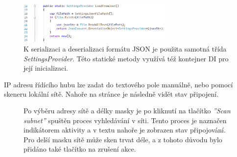 \begin{figure}[hbt]
\includegraphics[width=0.68\textwidth]{obrazky-figures/code-settingsjson.png}
\caption{K serializaci a deserializaci formátu JSON je použita samotná třída {\it SettingsProvider}. Této statické metody využívá též kontejner DI pro její inicializaci.}
\end{figure}

\pagebreak

IP adresu řídícího hubu lze zadat do textového pole manuálně, nebo pomocí skeneru lokální sítě. Nahoře na stránce je následně vidět stav připojení.

\begin{figure}[hbt]
\centering
{}
\caption{Po výběru adresy sítě a délky masky je po kliknutí na tlačítko {\it ''Scan subnet''} spuštěn proces vyhledávání v síti. Tento proces je naznačen indikátorem aktivity a v textu nahoře je zobrazen stav připojování. Pro delší masku sítě může sken trvat déle, a z tohoto důvodu bylo přidáno také tlačítko na zrušení akce.}
\end{figure}

